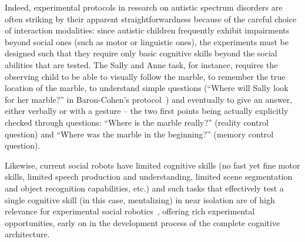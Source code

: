Indeed, experimental protocols in research on autistic spectrum disorders are often
striking by their apparent straightforwardness because of the careful choice of
interaction modalities: since autistic children frequently exhibit impairments
beyond social ones (such as motor or linguistic ones), the experiments must be
designed such that they require only basic cognitive skills beyond the social
abilities that are tested. The Sally and Anne task, for instance, requires the
observing child to be able to visually follow the marble, to remember the true
location of the marble, to understand simple questions (``Where will Sally look
for her marble?'' in Baron-Cohen's protocol~\parencite{baron1985does}) and eventually
to give an answer, either verbally or with a gesture -- the two first points
being actually explicitly checked through questions: ``Where is the marble
really?'' (reality control question) and ``Where was the marble in the
beginning?'' (memory control question).

Likewise, current social robots have limited cognitive skills (no fast yet fine
motor skills, limited speech production and understanding, limited scene
segmentation and object recognition capabilities, etc.) and such tasks that
effectively test a single cognitive skill (in this case, mentalizing) in near
isolation are of high relevance for experimental social
robotics~\parencite{lemaignan2015mutual}, offering rich experimental
opportunities, early on in the development process of the complete cognitive
architecture.

